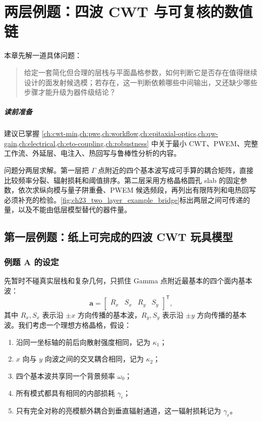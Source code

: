\chapter[两层例题]{两层例题：四波 CWT 与可复核的数值链}
\label{ch:worked-example}

本章先解一道具体问题：
\begin{quote}
给定一套简化但合理的层栈与平面晶格参数，如何判断它是否存在值得继续设计的面发射候选模；若存在，这一判断依赖哪些中间输出，又还缺少哪些步骤才能升级为器件级结论？
\end{quote}

\paragraph{读前准备}
建议已掌握 \cref{ch:cwt-min,ch:pwe,ch:workflow,ch:epitaxial-optics,ch:qw-gain,ch:electrical,ch:eto-coupling,ch:robustness} 中关于最小 CWT、PWEM、完整工作流、外延层、电注入、热回写与鲁棒性分析的内容。


问题分两层求解。第一层把 $\Gamma$ 点附近的四个基本波写成可手算的耦合矩阵，直接比较频率分裂、辐射损耗和阈值排序。第二层采用方格晶格圆孔 slab 的固定参数，依次求纵向模与量子阱重叠、PWEM 候选频段，再列出有限阵列和电热回写必须补充的检验。\cref{fig:ch23_two_layer_example_bridge}标出两层之间可传递的量，以及不能由低层模型替代的器件量。

\section[第一层玩具模型]{第一层例题：纸上可完成的四波 CWT 玩具模型}
\subsection{例题 A 的设定}
先暂时不碰真实层栈和复杂几何，只抓住 Gamma 点附近最基本的四个面内基本波：
\[
\bm{a}
=
\begin{bmatrix}
R_x & S_x & R_y & S_y
\end{bmatrix}^{\mathsf T},
\]
其中 $R_x,S_x$ 表示沿 $\pm x$ 方向传播的基本波，$R_y,S_y$ 表示沿 $\pm y$ 方向传播的基本波。我们考虑一个理想方格晶格，假设：
\begin{enumerate}
  \item 沿同一坐标轴的前后向散射强度相同，记为 $\kappa_1$；
  \item $x$ 向与 $y$ 向波之间的交叉耦合相同，记为 $\kappa_2$；
  \item 四个基本波共享同一个背景频率 $\omega_0$；
  \item 所有模式都具有相同的内部损耗 $\gamma_i$；
  \item 只有完全对称的亮模额外耦合到垂直辐射通道，这一辐射损耗记为 $\gamma_r$。
\end{enumerate}

